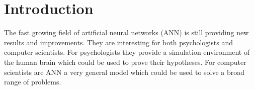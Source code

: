 




\section*{Introduction}
\label{sec:introduction} 


The fast growing field of artificial neural networks (ANN) is still providing new results and improvements. They are interesting for both psychologists and computer scientists. For psychologists they provide a simulation environment of the human brain which could be used to prove their hypotheses. For computer scientists are ANN a very general model which could be used to solve a broad range of problems. 




